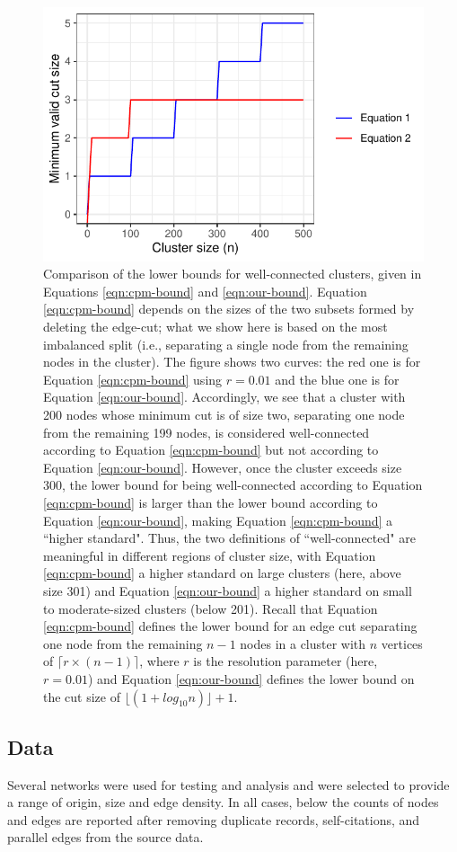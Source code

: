 \documentclass[11pt]{article}   	%
\begin{document}
\begin{figure}[H]
\centering
\includegraphics[width=0.7\linewidth]{figs/well_connected_definition.pdf}
\caption{Comparison of  the  lower bounds for well-connected clusters,  given in Equations \ref{eqn:cpm-bound} and \ref{eqn:our-bound}.
Equation \ref{eqn:cpm-bound} depends on the sizes of the two subsets formed by deleting the edge-cut; what we show here is based on the most imbalanced split (i.e., separating a single node from the remaining nodes in the cluster).
The figure shows two curves: the red one is for Equation \ref{eqn:cpm-bound} using $r=0.01$ and the blue one is for Equation \ref{eqn:our-bound}.
Accordingly, we see that a cluster with 200 nodes whose minimum cut is of size two, separating one node from the remaining 199 nodes, is considered well-connected
according to Equation \ref{eqn:cpm-bound}  but not according to Equation \ref{eqn:our-bound}.  However, once the cluster exceeds size 300, the lower bound for being well-connected according to
Equation \ref{eqn:cpm-bound}   is larger than the lower bound according to Equation \ref{eqn:our-bound}, making
Equation \ref{eqn:cpm-bound} a ``higher standard".
Thus, the two definitions of ``well-connected"  are meaningful in different
regions of cluster size, with Equation \ref{eqn:cpm-bound}  a higher standard on large clusters (here, above size 301) and Equation \ref{eqn:our-bound}   a higher standard on small to moderate-sized clusters (below 201).
Recall that Equation \ref{eqn:cpm-bound}  defines the lower bound for an edge cut separating one node from the remaining $n-1$ nodes
  in a cluster with $n$ vertices of $\lceil r \times (n-1) \rceil$, where $r$ is the resolution parameter (here, $r=0.01$)
and Equation \ref{eqn:our-bound} defines the lower bound on the cut size of $\lfloor(1 + log_{10}n)\rfloor +1$.}
\end{figure}

 \subsection{Data} Several networks were used for testing and analysis and were selected to provide a range of origin, size and edge density. In all cases, below the counts of nodes and edges are reported after removing duplicate records,
self-citations, and parallel edges from the source data.
\end{document}
